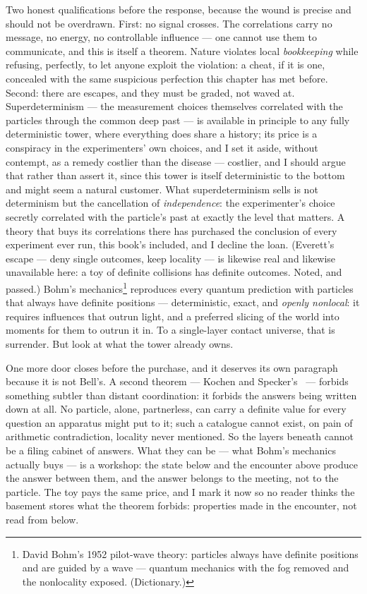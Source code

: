 \documentclass[fontsize=11pt,paper=a4,pagesize=auto,parskip=half-]{scrbook}
\newcommand{\Ixtmp}{}
\DeclareRobustCommand{\Ix}[1]{%
  #1%
  \begingroup
    \lowercase{\gdef\Ixtmp{#1}}%
    \expandafter\index\expandafter{\Ixtmp}%
  \endgroup}
\newcommand{\Iy}[1]{#1\index{#1}}
\begin{document}
Two honest qualifications before the response, because the wound is precise and should not be overdrawn. First: no signal crosses. The correlations carry no message, no energy, no controllable influence --- one cannot use them to communicate, and this is itself a theorem. Nature violates local \emph{bookkeeping} while refusing, perfectly, to let anyone exploit the violation: a cheat, if it is one, concealed with the same suspicious perfection this chapter has met before. Second: there are escapes, and they must be graded, not waved at. \Ix{Superdeterminism} --- the measurement choices themselves correlated with the particles through the common deep past --- is available in principle to any fully deterministic tower, where everything does share a history; its price is a conspiracy in the experimenters' own choices, and I set it aside, without contempt, as a remedy costlier than the disease --- costlier, and I should argue that rather than assert it, since this tower is itself deterministic to the bottom and might seem a natural customer. What superdeterminism sells is not determinism but the cancellation of \emph{independence}: the experimenter's choice secretly correlated with the particle's past at exactly the level that matters. A theory that buys its correlations there has purchased the conclusion of every experiment ever run, this book's included, and I decline the loan. (Everett's escape --- deny single outcomes, keep locality --- is likewise real and likewise unavailable here: a toy of definite collisions has definite outcomes. Noted, and passed.) \Iy{Bohm}'s mechanics\footnote{David Bohm's 1952 pilot-wave theory: particles always have definite positions and are guided by a wave --- quantum mechanics with the fog removed and the nonlocality exposed. (Dictionary.)} reproduces every quantum prediction with particles that always have definite positions --- deterministic, exact, and \emph{openly nonlocal}: it requires influences that outrun light, and a preferred slicing of the world into moments for them to outrun it in. To a single-layer contact universe, that is surrender. But look at what the tower already owns.

One more door closes before the purchase, and it deserves its own paragraph because it is not Bell's. A second theorem --- Kochen and Specker's~\cite{kochenspecker1967} --- forbids something subtler than distant coordination: it forbids the answers being written down at all. No particle, alone, partnerless, can carry a definite value for every question an apparatus might put to it; such a catalogue cannot exist, on pain of arithmetic contradiction, locality never mentioned. So the layers beneath cannot be a filing cabinet of answers. What they can be --- what Bohm's mechanics actually buys --- is a workshop: the state below and the encounter above produce the answer between them, and the answer belongs to the meeting, not to the particle. The toy pays the same price, and I mark it now so no reader thinks the basement stores what the theorem forbids: properties made in the encounter, not read from below.
\end{document}
